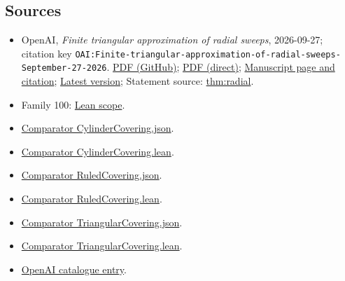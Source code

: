 \documentclass[11pt]{article}
\begin{document}
\subsection{Sources}
\begin{itemize}
\item OpenAI, \emph{Finite triangular approximation of radial sweeps}, 2026-09-27; citation key \texttt{OAI:Finite-triangular-approximation-of-radial-sweeps-September-27-2026}. \href{https://github.com/openai/math/blob/adc7f1241b42e322a6451854ab7e4b4c146bf78a/preprints/Finite-triangular-approximation-of-radial-sweeps-September-27-2026/main.pdf}{PDF (GitHub)}; \href{https://github.com/openai/math/raw/adc7f1241b42e322a6451854ab7e4b4c146bf78a/preprints/Finite-triangular-approximation-of-radial-sweeps-September-27-2026/main.pdf}{PDF (direct)}; \href{https://github.com/openai/math/blob/adc7f1241b42e322a6451854ab7e4b4c146bf78a/preprints/Finite-triangular-approximation-of-radial-sweeps-September-27-2026/README.md}{Manuscript page and citation}; \href{https://github.com/openai/math/blob/main/preprints/Finite-triangular-approximation-of-radial-sweeps-September-27-2026/main.pdf}{Latest version}; Statement source: \href{https://github.com/openai/math/blob/adc7f1241b42e322a6451854ab7e4b4c146bf78a/preprints/Finite-triangular-approximation-of-radial-sweeps-September-27-2026/build/introduction.tex\#L64}{thm:radial}.
\item Family 100: \href{https://github.com/openai/math/blob/adc7f1241b42e322a6451854ab7e4b4c146bf78a/lean/docs/100.md}{Lean scope}.
\item \href{https://github.com/openai/math/blob/adc7f1241b42e322a6451854ab7e4b4c146bf78a/lean/ComparatorChallenges/CylinderCovering.json}{Comparator CylinderCovering.json}.
\item \href{https://github.com/openai/math/blob/adc7f1241b42e322a6451854ab7e4b4c146bf78a/lean/ComparatorChallenges/CylinderCovering.lean}{Comparator CylinderCovering.lean}.
\item \href{https://github.com/openai/math/blob/adc7f1241b42e322a6451854ab7e4b4c146bf78a/lean/ComparatorChallenges/RuledCovering.json}{Comparator RuledCovering.json}.
\item \href{https://github.com/openai/math/blob/adc7f1241b42e322a6451854ab7e4b4c146bf78a/lean/ComparatorChallenges/RuledCovering.lean}{Comparator RuledCovering.lean}.
\item \href{https://github.com/openai/math/blob/adc7f1241b42e322a6451854ab7e4b4c146bf78a/lean/ComparatorChallenges/TriangularCovering.json}{Comparator TriangularCovering.json}.
\item \href{https://github.com/openai/math/blob/adc7f1241b42e322a6451854ab7e4b4c146bf78a/lean/ComparatorChallenges/TriangularCovering.lean}{Comparator TriangularCovering.lean}.
\item \href{https://github.com/openai/math/blob/adc7f1241b42e322a6451854ab7e4b4c146bf78a/CONTENTS.md}{OpenAI catalogue entry}.
\end{itemize}
\end{document}
